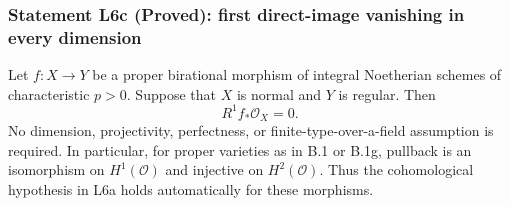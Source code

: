 \subsubsection*{Statement L6c (Proved): first direct-image vanishing in every dimension}
\begin{theorem}
\label{B:L6-R1-vanishing}
Let $f:X\to Y$ be a proper birational morphism of integral
Noetherian schemes of characteristic $p>0$.  Suppose that $X$
is normal and $Y$ is regular.  Then
\[
                    R^1f_*\mathcal O_X=0.
\]
No dimension, projectivity, perfectness, or finite-type-over-a-field
assumption is required.  In particular, for proper varieties as in
B.1 or B.1g, pullback is an isomorphism on $H^1(\mathcal O)$ and
injective on $H^2(\mathcal O)$.  Thus the cohomological hypothesis
in L6a holds automatically for these morphisms.
\end{theorem}
